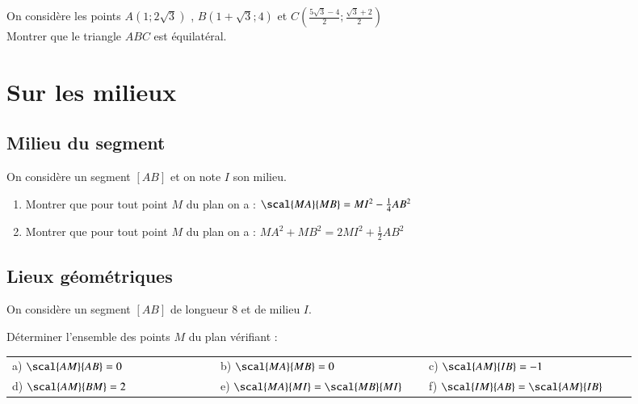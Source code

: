 \documentclass[oneside,12pt]{article}          %
\begin{document}
On considère les points $A(1;2\sqrt{3})$ , $B(1+\sqrt{3};4)$ et $C\left(\frac{5\sqrt{3}-4}{2};\frac{\sqrt{3}+2}{2}\right)$\\
Montrer que le triangle $ABC$ est équilatéral.



\section{Sur les milieux}

\subsection{Milieu du segment}

On considère un segment $[AB]$ et on note $I$ son milieu.

\begin{enumerate}
    \item Montrer que pour tout point $M$ du plan on a : $\scal{MA}{MB}=MI^2-\frac{1}{4}AB^2$
    \item Montrer que pour tout point $M$ du plan on a : $MA^2+MB^2=2MI^2+\frac{1}{2}AB^2$
\end{enumerate}



\subsection{Lieux géométriques}
On considère un segment $[AB]$ de longueur 8 et de milieu $I$.

Déterminer l'ensemble des points $M$ du plan vérifiant :\\[5pt]
\begin{tabular}{p{0.3\linewidth} p{0.3\linewidth} p{0.3\linewidth}}
    a) $\scal{AM}{AB}=0$ & b) $\scal{MA}{MB}=0$ & c) $\scal{AM}{IB}=-1$ \\
    d) $\scal{AM}{BM}=2$ & e) $\scal{MA}{MI}=\scal{MB}{MI}$ & f) $\scal{IM}{AB}=\scal{AM}{IB}$
\end{tabular}
\end{document}
